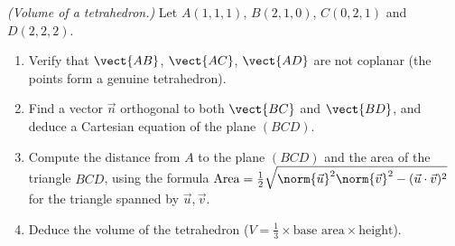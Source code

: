 \begin{exercise}[$\star\star\star$]\label{exo:tle:space:9}
\emph{(Volume of a tetrahedron.)} Let $A(1,1,1)$, $B(2,1,0)$, $C(0,2,1)$
and $D(2,2,2)$.
\begin{enumerate}
  \item Verify that $\vect{AB}$, $\vect{AC}$, $\vect{AD}$ are not coplanar
        (the points form a genuine tetrahedron).
  \item Find a vector $\vec n$ orthogonal to both $\vect{BC}$ and
        $\vect{BD}$, and deduce a Cartesian equation of the plane $(BCD)$.
  \item Compute the distance from $A$ to the plane $(BCD)$ and the area of
        the triangle $BCD$, using the formula
        $\text{Area} = \frac12\sqrt{\norm{\vec u}^2\norm{\vec v}^2 -
        (\vec u \cdot \vec v)^2}$ for the triangle spanned by
        $\vec u, \vec v$.
  \item Deduce the volume of the tetrahedron
        ($V = \frac13 \times \text{base area} \times \text{height}$).
\end{enumerate}
\end{exercise}
